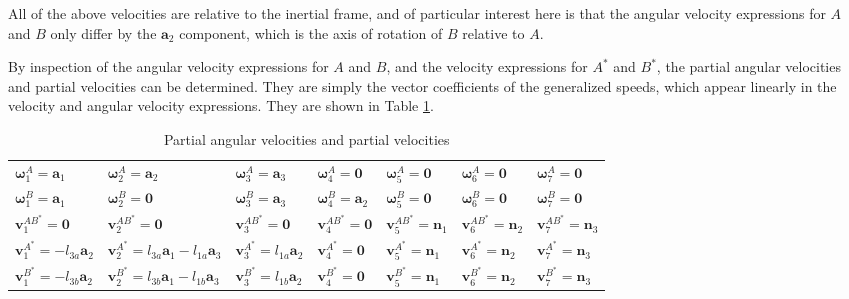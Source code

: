 \documentclass[letterpaper,11pt]{article}
\newcommand{\bs}[1]{ \boldsymbol{ #1 } }
\begin{document}
All of the above velocities are relative to the inertial frame, and of
particular interest here is that the angular velocity expressions for $A$ and
$B$ only differ by the $\bs{a}_2$ component, which is the axis of rotation of
$B$ relative to $A$.

By inspection of the angular velocity expressions for $A$ and $B$, and the
velocity expressions for $A^*$ and $B^*$, the partial angular velocities and
partial velocities can be determined.  They are simply the vector coefficients
of the generalized speeds, which appear linearly in the velocity and angular
velocity expressions.  They are shown in Table \ref{partialvelocities}.

\begin{table}[!h]
  \begin{center}
    \begin{tabular}{lllllll}
      $\bs{\omega}^A_1 = \bs{a}_1$ & $\bs{\omega}^A_2 = \bs{a}_2$ &
      $\bs{\omega}^A_3 = \bs{a}_3$ & $\bs{\omega}^A_4 = \bs{0}$ &
      $\bs{\omega}^A_5 = \bs{0}$ & $\bs{\omega}^A_6 = \bs{0}$ &
      $\bs{\omega}^A_7 = \bs{0}$ \\
%
      $\bs{\omega}^B_1 = \bs{a}_1$ & $\bs{\omega}^B_2 = \bs{0}$ &
      $\bs{\omega}^B_3 = \bs{a}_3$ & $\bs{\omega}^B_4 = \bs{a}_2$ &
      $\bs{\omega}^B_5 = \bs{0}$ & $\bs{\omega}^B_6 = \bs{0}$ &
      $\bs{\omega}^B_7 = \bs{0}$ \\
%
      $\bs{v}^{AB^*}_1 = \bs{0}$ & $\bs{v}^{AB^*}_2 = \bs{0}$ &
      $\bs{v}^{AB^*}_3 = \bs{0}$ & $\bs{v}^{AB^*}_4 = \bs{0}$ &
      $\bs{v}^{AB^*}_5 = \bs{n}_1$ & $\bs{v}^{AB^*}_6 = \bs{n}_2$ &
      $\bs{v}^{AB^*}_7 = \bs{n}_3$ \\
%
      $\bs{v}^{A^*}_1 = -l_{3a}\bs{a}_2$ &
      $\bs{v}^{A^*}_2 = l_{3a}\bs{a}_1 - l_{1a}\bs{a}_3$ &
      $\bs{v}^{A^*}_3 = l_{1a} \bs{a}_2$ &
      $\bs{v}^{A^*}_4 = \bs{0}$ & $\bs{v}^{A^*}_5 = \bs{n}_1$ & 
      $\bs{v}^{A^*}_6 = \bs{n}_2$ & $\bs{v}^{A^*}_7 = \bs{n}_3$ \\
%
      $\bs{v}^{B^*}_1 = -l_{3b}\bs{a}_2$ &
      $\bs{v}^{B^*}_2 = l_{3b}\bs{a}_1 - l_{1b}\bs{a}_3$ &
      $\bs{v}^{B^*}_3 = l_{1b} \bs{a}_2$ & $\bs{v}^{B^*}_4 = \bs{0}$ &
      $\bs{v}^{B^*}_5 = \bs{n}_1$ & $\bs{v}^{B^*}_6 = \bs{n}_2$ &
      $\bs{v}^{B^*}_7 = \bs{n}_3$
%
    \end{tabular}
  \end{center}
  \caption{Partial angular velocities and partial velocities}
  \label{partialvelocities}
\end{table}
\end{document}
